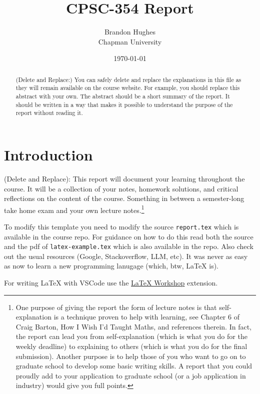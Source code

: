 \documentclass{article}
\title{CPSC-354 Report}
\author{Brandon Hughes \\ Chapman University}
\date{\today}
\theoremstyle{theorem}
\theoremstyle{definition}
\theoremstyle{remark}
\begin{document}
\maketitle

\begin{abstract}
(Delete and Replace:) You can safely delete and replace the explanations in this file as they will remain available on the course website. For example, you should replace this abstract with your own. The abstract should be a short summary of the report. It should be written in a way that makes it possible to understand the purpose of the report without reading it.  
\end{abstract}

\setcounter{tocdepth}{3}
\tableofcontents

\section{Introduction}\label{intro}

(Delete and Replace): This report will document your learning throughout the course. It will be a collection of your notes, homework solutions, and critical reflections on the content of the course. Something in between a semester-long take home exam and your own lecture notes.\footnote{One purpose of giving the report the form of lecture notes is that self-explanation is a technique proven to help with learning, see Chapter 6 of Craig Barton, How I Wish I'd Taught Maths, and references therein. In fact, the report can lead you from self-explanation (which is what you do for the weekly deadline) to explaining to others (which is what you do for the final submission). Another purpose is to help those of you who want to go on to graduate school to develop some basic writing skills. A report that you could proudly add to your application to graduate school (or a job application in industry) would give you full points.}

To modify this template you need to modify the source \texttt{report.tex} which is available in the course repo. For guidance on how to do this read both the source and the pdf of \texttt{latex-example.tex} which is also available in the repo. Also check out the usual resources (Google, Stackoverflow, LLM, etc). It was never as easy as now to learn a new programming lanugage (which, btw, \LaTeX{} is).

For writing \LaTeX{} with VSCode use the \href{https://marketplace.visualstudio.com/items?itemName=James-Yu.latex-workshop}{LaTeX Workshop} extension. 
\end{document}
